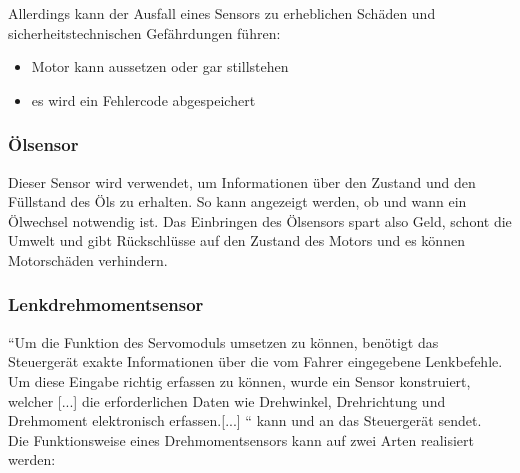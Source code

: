			Allerdings kann der Ausfall eines Sensors zu erheblichen Schäden und sicherheitstechnischen Gefährdungen führen:
			\begin{itemize}
				\item Motor kann aussetzen oder gar stillstehen
				\item es wird ein Fehlercode abgespeichert
            \end{itemize}
           
            \subsubsection{Ölsensor}
					
            Dieser Sensor wird verwendet, um Informationen über den Zustand und den Füllstand des Öls zu erhalten. So kann angezeigt werden, ob und wann ein Ölwechsel notwendig ist. 
            Das Einbringen des Ölsensors spart also Geld, schont die Umwelt und gibt Rückschlüsse auf den Zustand des Motors und es können Motorschäden verhindern.\cite{TS_oel}
            
            \subsubsection{Lenkdrehmomentsensor}

            ``Um die Funktion des Servomoduls umsetzen zu können, benötigt das Steuergerät exakte Informationen über die vom Fahrer eingegebene Lenkbefehle. Um diese Eingabe richtig erfassen zu können, wurde ein Sensor konstruiert, welcher [...] die erforderlichen Daten wie Drehwinkel, Drehrichtung und Drehmoment elektronisch erfassen.[...] ``  \cite{TS_dreh} kann und an das Steuergerät sendet.\\
            
            Die Funktionsweise eines Drehmomentsensors kann auf zwei Arten realisiert werden:\\
            
